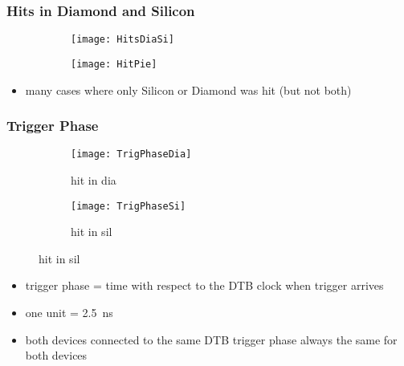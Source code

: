 \begin{frame}
	\frametitle{Hits in Diamond and Silicon}
	\begin{figure} 
		\begin{center}
			\begin{subfigure}{0.45\textwidth}  
				\centering 
				\texttt{[image: HitsDiaSi]}
			\end{subfigure}
			\begin{subfigure}{0.45\textwidth} 
				\centering 
				\texttt{[image: HitPie]}
			\end{subfigure} 
		\end{center}
	\end{figure}
	\begin{itemize}
		\item many cases where only Silicon or Diamond was hit (but not both)
	\end{itemize}
\end{frame}
\begin{frame}
	\frametitle{Trigger Phase}
	\begin{figure} 
		\begin{center}
			\begin{subfigure}{0.45\textwidth}  
				\centering 
				\texttt{[image: TrigPhaseDia]}
				\caption{hit in dia}
			\end{subfigure}
			\begin{subfigure}{0.45\textwidth} 
				\centering 
				\texttt{[image: TrigPhaseSi]}
				\caption{hit in sil}
			\end{subfigure} 
		\end{center}
	\end{figure}
	\begin{itemize}
		\item trigger phase = time with respect to the DTB clock when trigger arrives
		\item one unit = \SI{2.5}{ns}
		\item both devices connected to the same DTB \ra trigger phase always the same for both devices
	\end{itemize}
\end{frame}
